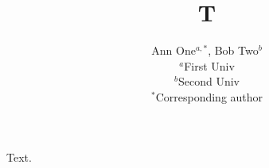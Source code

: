 \documentclass{article}
\title{T}
\author{Ann One$^{a,*}$, Bob Two$^{b}$\\ $^a$First Univ\\ $^b$Second Univ\\ $^*$Corresponding author}
\begin{document}
\maketitle
Text.
\end{document}
